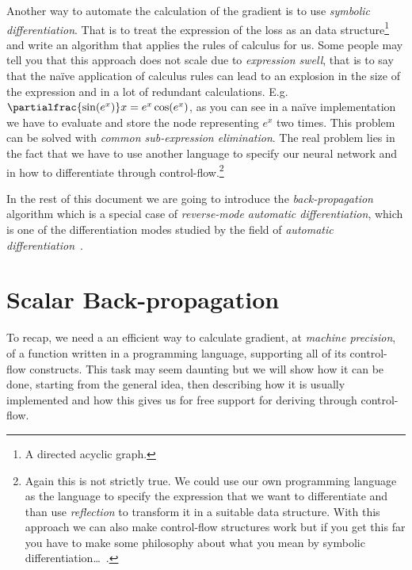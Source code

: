 \documentclass{article}
\begin{document}
Another way to automate the calculation of the gradient is to use
\emph{symbolic differentiation}. That is to treat the expression of the loss
as an data structure\footnote{A directed acyclic graph.} and write an algorithm
that applies the rules of calculus for us. Some people may tell you that this
approach does not scale due to \emph{expression swell}, that is to say that the
na\"ive application of calculus rules can lead to an explosion in the size of
the expression and in a lot of redundant calculations. E.g.
\(\partialfrac{\sin(e^x)} x = e^x \cos(e^x)\), as you can see in a na\"ive
implementation we have to evaluate and store the node representing \(e^x\) two
times. This problem can be solved with \emph{common sub-expression
elimination}. The real problem lies in the fact that we have to use another
language to specify our neural network and in how to differentiate through
control-flow.\footnote{Again this is not strictly true. We could use our own
programming language as the language to specify the expression that we want to
differentiate and than use \emph{reflection} to transform it in a suitable data
structure. With this approach we can also make control-flow structures work but
if you get this far you have to make some philosophy about what you mean by
symbolic differentiation\dots~\cite{equiv}.}

In the rest of this document we are going to introduce the
\emph{back-propagation} algorithm which is a special case of \emph{reverse-mode
automatic differentiation}, which is one of the differentiation modes studied
by the field of \emph{automatic differentiation}~\cite{survey,griewank}.

\section{Scalar Back-propagation}

To recap, we need a an efficient way to calculate gradient, at \emph{machine
precision}, of a function written in a programming language, supporting all of
its control-flow constructs. This task may seem daunting but we will show how
it can be done, starting from the general idea, then describing how it is
usually implemented and how this gives us for free support for deriving through
control-flow.
\end{document}
